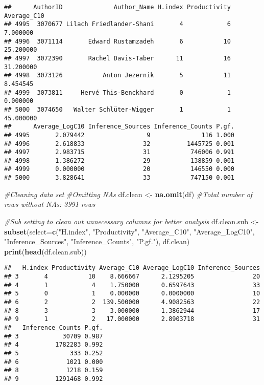 \documentclass[
]{article}
\newenvironment{Shaded}{\begin{snugshade}}{\end{snugshade}}
\newcommand{\AttributeTok}[1]{\textcolor[rgb]{0.13,0.29,0.53}{#1}}
\newcommand{\CommentTok}[1]{\textcolor[rgb]{0.56,0.35,0.01}{\textit{#1}}}
\newcommand{\FunctionTok}[1]{\textcolor[rgb]{0.13,0.29,0.53}{\textbf{#1}}}
\newcommand{\NormalTok}[1]{#1}
\newcommand{\OtherTok}[1]{\textcolor[rgb]{0.56,0.35,0.01}{#1}}
\newcommand{\StringTok}[1]{\textcolor[rgb]{0.31,0.60,0.02}{#1}}
\begin{document}
\begin{verbatim}
##      AuthorID              Author_Name H.index Productivity Average_C10
## 4995  3070677 Lilach Friedlander-Shani       4            6    7.000000
## 4996  3071114       Edward Rustamzadeh       6           10   25.200000
## 4997  3072390       Rachel Davis-Taber      11           16   31.200000
## 4998  3073126           Anton Jezernik       5           11    8.454545
## 4999  3073811     Hervé This-Benckhard       0            1    0.000000
## 5000  3074650   Walter Schlüter‐Wigger       1            1   45.000000
##      Average_LogC10 Inference_Sources Inference_Counts P.gf.
## 4995       2.079442                 9              116 1.000
## 4996       2.618833                32          1445725 0.001
## 4997       2.983715                31           746006 0.991
## 4998       1.386272                29           138859 0.001
## 4999       0.000000                20           146550 0.000
## 5000       3.828641                33           747150 0.001
\end{verbatim}

\begin{Shaded}
\begin{Highlighting}[]
\CommentTok{\#Cleaning data set}
\CommentTok{\#Omitting NAs}
\NormalTok{df.clean }\OtherTok{\textless{}{-}} \FunctionTok{na.omit}\NormalTok{(df)}
\CommentTok{\#Total number of rows without NAs: 3991 rows}

\CommentTok{\#Sub setting to clean out unnecessary columns for better analysis}
\NormalTok{df.clean.sub }\OtherTok{\textless{}{-}} \FunctionTok{subset}\NormalTok{(}\AttributeTok{select=}\FunctionTok{c}\NormalTok{(}\StringTok{"H.index"}\NormalTok{, }\StringTok{"Productivity"}\NormalTok{, }\StringTok{"Average\_C10"}\NormalTok{, }\StringTok{"Average\_LogC10"}\NormalTok{, }\StringTok{"Inference\_Sources"}\NormalTok{, }\StringTok{"Inference\_Counts"}\NormalTok{, }\StringTok{"P.gf."}\NormalTok{), df.clean)}
\FunctionTok{print}\NormalTok{(}\FunctionTok{head}\NormalTok{(df.clean.sub))}
\end{Highlighting}
\end{Shaded}

\begin{verbatim}
##   H.index Productivity Average_C10 Average_LogC10 Inference_Sources
## 3       4           10    8.666667      2.1295205                20
## 4       1            4    1.750000      0.6597643                33
## 5       0            1    0.000000      0.0000000                10
## 6       2            2  139.500000      4.9082563                22
## 8       3            3    3.000000      1.3862944                17
## 9       1            2   17.000000      2.8903718                31
##   Inference_Counts P.gf.
## 3            30709 0.987
## 4          1782283 0.992
## 5              333 0.252
## 6             1021 0.000
## 8             1218 0.159
## 9          1291468 0.992
\end{verbatim}
\end{document}
